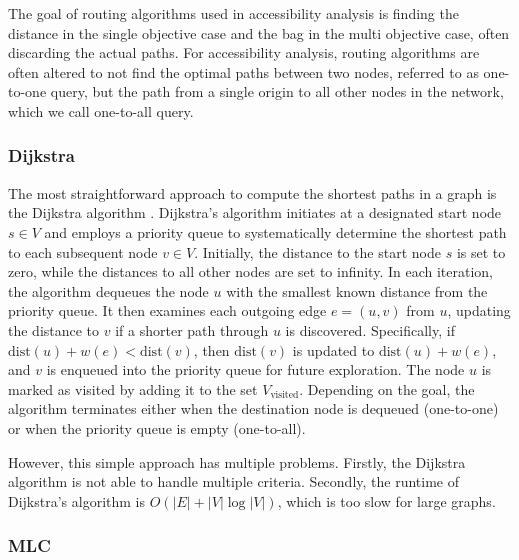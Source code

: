 The goal of routing algorithms used in accessibility analysis is finding the distance in the single objective case and the bag in the multi objective case, often discarding the actual paths.
For accessibility analysis, routing algorithms are often altered to not find the optimal paths between two nodes, referred to as one-to-one query, but the path from a single origin to all other nodes in the network, which we call one-to-all query.

\subsubsection{Dijkstra}
\label{subsubsec:dijkstra}
The most straightforward approach to compute the shortest paths in a graph is the Dijkstra algorithm .
Dijkstra's algorithm initiates at a designated start node \( s \in V \) and employs a priority queue to systematically determine the shortest path to each subsequent node \( v \in V \).
Initially, the distance to the start node \( s \) is set to zero, while the distances to all other nodes are set to infinity.
In each iteration, the algorithm dequeues the node \( u \) with the smallest known distance from the priority queue.
It then examines each outgoing edge \( e = (u, v) \) from \( u \), updating the distance to \( v \) if a shorter path through \( u \) is discovered.
Specifically, if \( \text{dist}(u) + w(e) < \text{dist}(v) \), then \( \text{dist}(v) \) is updated to \( \text{dist}(u) + w(e) \), and \( v \) is enqueued into the priority queue for future exploration.
The node \( u \) is marked as visited by adding it to the set \( V_{\text{visited}} \).
Depending on the goal, the algorithm terminates either when the destination node is dequeued (one-to-one) or when the priority queue is empty (one-to-all).


However, this simple approach has multiple problems.
Firstly, the Dijkstra algorithm is not able to handle multiple criteria.
Secondly, the runtime of Dijkstra's algorithm is \( O(|E| + |V| \log |V|) \), which is too slow for large graphs.

\subsubsection{MLC}
\label{subsubsec:mlc}

